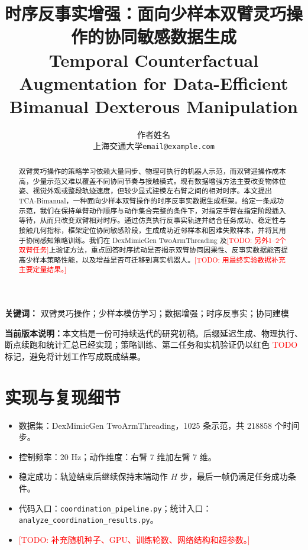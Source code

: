 \documentclass[UTF8,a4paper,10.5pt]{ctexart}
\title{\textbf{时序反事实增强：面向少样本双臂灵巧操作的协同敏感数据生成}\\
\large Temporal Counterfactual Augmentation for Data-Efficient Bimanual Dexterous Manipulation}
\author{作者姓名 \\ 上海交通大学\quad \texttt{email@example.com}}
\date{}
\newcommand{\method}{TCA-Bimanual}
\newcommand{\todo}[1]{\textcolor{red}{[TODO: #1]}}
\begin{document}
\maketitle

\begin{abstract}
双臂灵巧操作的策略学习依赖大量同步、物理可执行的机器人示范，而双臂遥操作成本高，少量示范又难以覆盖不同协同节奏与接触模式。现有数据增强方法主要改变物体位姿、视觉外观或整段轨迹速度，但较少显式建模左右臂之间的相对时序。本文提出\method{}，一种面向少样本双臂操作的时序反事实数据生成框架。给定一条成功示范，我们在保持单臂动作顺序与动作集合完整的条件下，对指定手臂在指定阶段插入等待，从而只改变双臂相对时序。通过仿真执行反事实轨迹并结合任务成功、稳定性与接触几何指标，框架定位协同敏感阶段，生成成功近邻样本和困难失败样本，并将其用于协同感知策略训练。我们在 DexMimicGen TwoArmThreading 及\todo{另外1--2个双臂任务}上验证方法，重点回答时序扰动是否揭示双臂协同因果性、反事实数据能否提高少样本策略性能，以及增益是否可迁移到真实机器人。\todo{用最终实验数据补充主要定量结果。}
\end{abstract}

\noindent\textbf{关键词：} 双臂灵巧操作；少样本模仿学习；数据增强；时序反事实；协同建模

\vspace{0.5em}
\noindent\textbf{当前版本说明：}本文档是一份可持续迭代的研究初稿。后缀延迟生成、物理执行、断点续跑和统计汇总已经实现；策略训练、第二任务和实机验证仍以红色 \textcolor{red}{TODO} 标记，避免将计划工作写成既成结果。










\appendix
\section{实现与复现细节}
\label{app:implementation}
\begin{itemize}
    \item 数据集：DexMimicGen TwoArmThreading，1025 条示范，共 218858 个时间步。
    \item 控制频率：20 Hz；动作维度：右臂 7 维加左臂 7 维。
    \item 稳定成功：轨迹结束后继续保持末端动作 $H$ 步，最后一帧仍满足任务成功条件。
    \item 代码入口：\texttt{coordination\_pipeline.py}；统计入口：\texttt{analyze\_coordination\_results.py}。
    \item \todo{补充随机种子、GPU、训练轮数、网络结构和超参数。}
\end{itemize}
\end{document}
